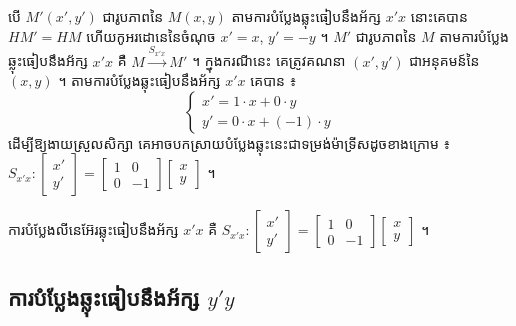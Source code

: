 \begin{center}
\end{center}

បើ $M'(x', y')$ ជារូបភាពនៃ $M(x, y)$ តាមការបំប្លែងឆ្លុះធៀបនឹងអ័ក្ស $x'x$ នោះគេបាន $HM' = HM$ ហើយកូអរដោនេនៃចំណុច $x' = x$, $y' = -y$ ។ $M'$ ជារូបភាពនៃ $M$ តាមការបំប្លែងឆ្លុះធៀបនឹងអ័ក្ស $x'x$ គឺ $M \xrightarrow{S_{x'x}} M'$ ។ ក្នុងករណីនេះ គេត្រូវគណនា $(x', y')$ ជាអនុគមន៍នៃ $(x, y)$ ។ តាមការបំប្លែងឆ្លុះធៀបនឹងអ័ក្ស $x'x$ គេបាន ៖
\[ \begin{cases} x' = 1\cdot x + 0\cdot y\\ y' = 0\cdot x + (-1)\cdot y \end{cases} \]
ដើម្បីឱ្យងាយស្រួលសិក្សា គេអាចបកស្រាយបំប្លែងឆ្លុះនេះជាទម្រង់ម៉ាទ្រីសដូចខាងក្រោម ៖ $S_{x'x} : \begin{bmatrix} x'\\ y' \end{bmatrix} = \begin{bmatrix} 1 & 0\\ 0 & -1 \end{bmatrix}\begin{bmatrix} x\\ y \end{bmatrix}$ ។

\begin{formulaBox}[ជាទូទៅ]
ការបំប្លែងលីនេអ៊ែរឆ្លុះធៀបនឹងអ័ក្ស $x'x$ គឺ $S_{x'x} : \begin{bmatrix} x'\\ y' \end{bmatrix} = \begin{bmatrix} 1 & 0\\ 0 & -1 \end{bmatrix}\begin{bmatrix} x\\ y \end{bmatrix}$ ។
\end{formulaBox}

\subsection{ការបំប្លែងឆ្លុះធៀបនឹងអ័ក្ស \texorpdfstring{$y'y$}{y'y}}

